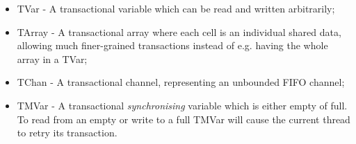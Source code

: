 \begin{itemize}
	\item TVar - A transactional variable which can be read and written arbitrarily;
	\item TArray - A transactional array where each cell is an individual shared data, allowing much finer-grained transactions instead of e.g. having the whole array in a TVar;
	\item TChan - A transactional channel, representing an unbounded FIFO channel;
	\item TMVar - A transactional \textit{synchronising} variable which is either empty of full. To read from an empty or write to a full TMVar will cause the current thread to retry its transaction.
\end{itemize}


